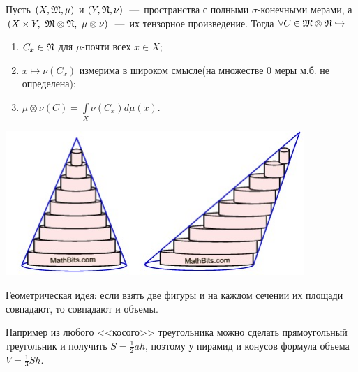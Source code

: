 \begin{theorem}
    Пусть $(X, \mathfrak{M}, \mu)$ и $(Y, \mathfrak{N}, \nu)$~---~пространства с полными $\sigma$-конечными мерами, а $(X \times Y, \ \MM \otimes \NN, \ \mu \otimes \nu)$~---~их тензорное произведение. Тогда $\forall C \in \mathfrak{M} \otimes \mathfrak{N} \hookrightarrow$
    \begin{enumerate}
        \item $C_x \in \mathfrak{N}$ для $\mu$-почти всех $x \in X$;
        \item $x \mapsto \nu(C_x)$ измерима в широком смысле(на множестве 0 меры м.б. не определена);
        \item $\mu\otimes\nu(C) = \int\limits_X \nu(C_x)d\mu(x)$.
    \end{enumerate}


\begin{minipage}{0.5\textwidth}%
    \includegraphics[width=0.85\textwidth]{images/Cavalery.jpg} 
\end{minipage}%
\hfill
\begin{minipage}{0.5\textwidth}\RaggedRight
Геометрическая идея: если взять две фигуры и на каждом сечении их площади совпадают, то совпадают и объемы.

Например из любого <<косого>> треугольника можно сделать прямоугольный треугольник и получить $S = \frac{1}{2}ah$, поэтому у пирамид и конусов формула объема $V = \frac{1}{3}Sh$.
\end{minipage}
\end{theorem}

